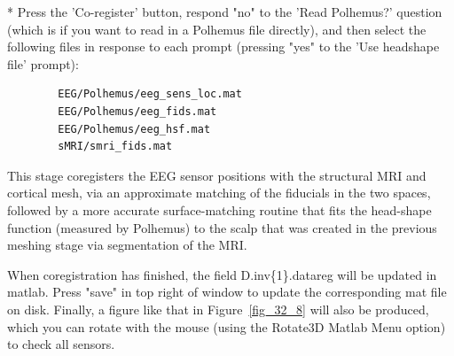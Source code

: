 * Press the 'Co-register' button, respond "no" to the 'Read Polhemus?' question (which is if you want to read in a Polhemus file directly), and then select the following files in response to each prompt (pressing "yes" to the 'Use headshape file' prompt):
\begin{verbatim}
        EEG/Polhemus/eeg_sens_loc.mat
        EEG/Polhemus/eeg_fids.mat
        EEG/Polhemus/eeg_hsf.mat
        sMRI/smri_fids.mat
\end{verbatim}
This stage coregisters the EEG sensor positions with the structural MRI and cortical mesh, via an approximate matching of the fiducials in the two spaces, followed by a more accurate surface-matching routine that fits the head-shape function (measured by Polhemus) to the scalp that was created in the previous meshing stage via segmentation of the MRI.

When coregistration has finished, the field D.inv\{1\}.datareg will be updated in matlab. Press "save" in top right of window to update the corresponding mat file on disk. Finally, a figure like that in Figure~\ref{fig_32_8} will also be produced, which you can rotate with the mouse (using the Rotate3D Matlab Menu option) to check all sensors.


